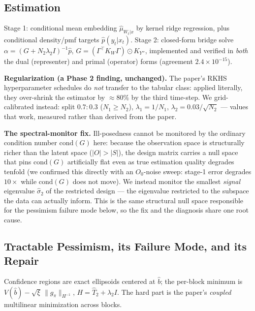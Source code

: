 \documentclass[11pt]{article}
\begin{document}
\subsection{Estimation}

Stage 1: conditional mean embedding $\hat\mu_{W_t|x}$ by kernel ridge regression, plus
conditional density/pmf targets $\hat p(y_t|x_t)$. Stage 2: closed-form bridge solve
$\alpha = (G + N_2\lambda_2 I)^{-1}\hat p$, $G = (\Gamma^\top K_W \Gamma) \odot K_{Y''}$,
implemented and verified in \emph{both} the dual (representer) and primal (operator) forms
(agreement $2.4\times10^{-15}$).

\textbf{Regularization (a Phase 2 finding, unchanged).} The paper's RKHS hyperparameter
schedules do \emph{not} transfer to the tabular class: applied literally, they over-shrink
the estimator by $\approx 80\%$ by the third time-step. We grid-calibrated instead: split
$0.7{:}0.3$ ($N_1 \ge N_2$), $\lambda_1 = 1/N_1$, $\lambda_2 = 0.03/\sqrt{N_2}$ --- values
that work, measured rather than derived from the paper.

\textbf{The spectral-monitor fix.} Ill-posedness cannot be monitored by the ordinary
condition number $\mathrm{cond}(G)$ here: because the observation space is structurally
richer than the latent space ($|O|>|S|$), the design matrix carries a null space that pins
$\mathrm{cond}(G)$ artificially flat even as true estimation quality degrades tenfold (we
confirmed this directly with an $O_0$-noise sweep: stage-1 error degrades $10\times$ while
$\mathrm{cond}(G)$ does not move). We instead monitor the smallest \emph{signal}
eigenvalue $\hat\sigma_2$ of the restricted design --- the eigenvalue restricted to the
subspace the data can actually inform. This is the same structural null space responsible
for the pessimism failure mode below, so the fix and the diagnosis share one root cause.

\subsection{Tractable Pessimism, its Failure Mode, and its Repair}
\label{sec:pessimism-method}

Confidence regions are exact ellipsoids centered at $\hat b$; the per-block minimum is
$V(\hat b) - \sqrt{\xi}\,\|g_\pi\|_{H^{-1}}$, $H = \hat T_2 + \lambda_2 I$. The hard part is
the paper's \emph{coupled} multilinear minimization across blocks.
\end{document}
